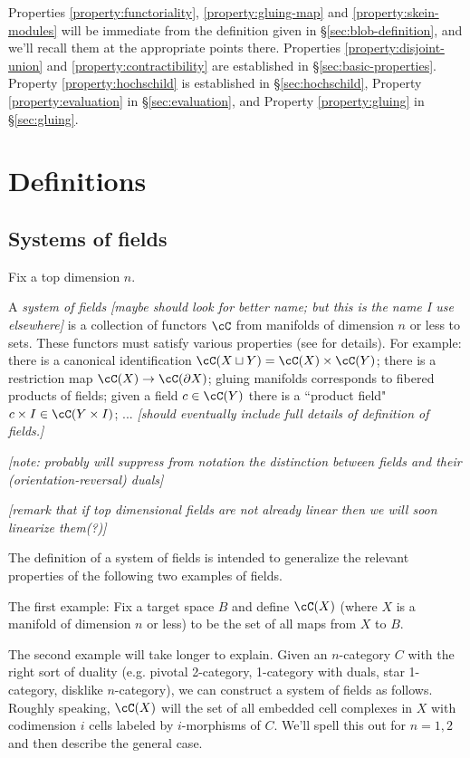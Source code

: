 \documentclass[11pt,leqno]{amsart}
\def\du{\sqcup}
\def\bd{\partial}
\def\nn#1{{{\it \small [#1]}}}
\begin{document}
Properties \ref{property:functoriality}, \ref{property:gluing-map} and \ref{property:skein-modules} will be immediate from the definition given in
\S \ref{sec:blob-definition}, and we'll recall them at the appropriate points there. 
Properties \ref{property:disjoint-union} and \ref{property:contractibility} are established in \S \ref{sec:basic-properties}.
Property \ref{property:hochschild} is established in \S \ref{sec:hochschild}, Property \ref{property:evaluation} in \S \ref{sec:evaluation},
and Property \ref{property:gluing} in \S \ref{sec:gluing}.

\section{Definitions}
\label{sec:definitions}

\subsection{Systems of fields}
\label{sec:fields}

Fix a top dimension $n$.

A {\it system of fields}
\nn{maybe should look for better name; but this is the name I use elsewhere}
is a collection of functors $\cC$ from manifolds of dimension $n$ or less
to sets.
These functors must satisfy various properties (see \cite{kw:tqft} for details).
For example:
there is a canonical identification $\cC(X \du Y) = \cC(X) \times \cC(Y)$;
there is a restriction map $\cC(X) \to \cC(\bd X)$;
gluing manifolds corresponds to fibered products of fields;
given a field $c \in \cC(Y)$ there is a ``product field"
$c\times I \in \cC(Y\times I)$; ...
\nn{should eventually include full details of definition of fields.}

\nn{note: probably will suppress from notation the distinction
between fields and their (orientation-reversal) duals}

\nn{remark that if top dimensional fields are not already linear
then we will soon linearize them(?)}

The definition of a system of fields is intended to generalize
the relevant properties of the following two examples of fields.

The first example: Fix a target space $B$ and define $\cC(X)$ (where $X$
is a manifold of dimension $n$ or less) to be the set of
all maps from $X$ to $B$.

The second example will take longer to explain.
Given an $n$-category $C$ with the right sort of duality
(e.g. pivotal 2-category, 1-category with duals, star 1-category, disklike $n$-category),
we can construct a system of fields as follows.
Roughly speaking, $\cC(X)$ will the set of all embedded cell complexes in $X$
with codimension $i$ cells labeled by $i$-morphisms of $C$.
We'll spell this out for $n=1,2$ and then describe the general case.
\end{document}
